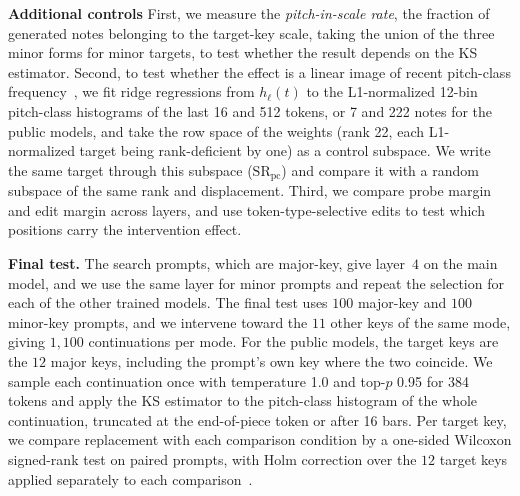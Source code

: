 \documentclass{article}
\begin{document}
\noindent\textbf{Additional controls}
First, we measure the \emph{pitch-in-scale rate}, the fraction of generated notes belonging to the target-key scale, taking the union of the three minor forms for minor targets, to test whether the result depends on the KS estimator.
Second, to test whether the effect is a linear image of recent pitch-class frequency~\cite{mimidi2026}, we fit ridge regressions from $h_\ell(t)$ to the L1-normalized 12-bin pitch-class histograms of the last 16 and 512 tokens, or 7 and 222 notes for the public models, and take the row space of the weights (rank 22, each L1-normalized target being rank-deficient by one) as a control subspace.
We write the same target through this subspace ($\mathrm{SR}_{\mathrm{pc}}$) and compare it with a random subspace of the same rank and displacement.
Third, we compare probe margin and edit margin across layers, and use token-type-selective edits to test which positions carry the intervention effect.

\noindent\textbf{Final test.}
The search prompts, which are major-key, give layer~$4$ on the main model, and we use the same layer for minor prompts and repeat the selection for each of the other trained models.
The final test uses $100$ major-key and $100$ minor-key prompts, and we intervene toward the $11$ other keys of the same mode, giving $1{,}100$ continuations per mode.
For the public models, the target keys are the $12$ major keys, including the prompt's own key where the two coincide.
We sample each continuation once with temperature 1.0 and top-$p$ 0.95 for 384 tokens and apply the KS estimator to the pitch-class histogram of the whole continuation, truncated at the end-of-piece token or after 16 bars.
Per target key, we compare replacement with each comparison condition by a one-sided Wilcoxon signed-rank test on paired prompts, with Holm correction over the $12$ target keys applied separately to each comparison~\cite{holm1979}.
\end{document}
